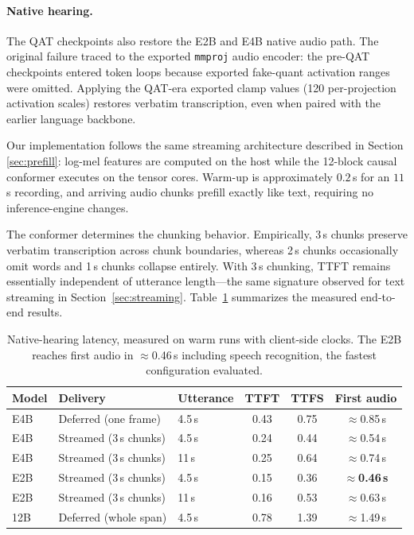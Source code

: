 \documentclass{article}
\begin{document}
\paragraph{Native hearing.}

The QAT checkpoints also restore the E2B and E4B native audio path. The
original failure traced to the exported \texttt{mmproj} audio encoder: the
pre-QAT checkpoints entered token loops because exported fake-quant activation
ranges were omitted. Applying the QAT-era exported clamp values (120
per-projection activation scales) restores verbatim transcription, even when
paired with the earlier language backbone.

Our implementation follows the same streaming architecture described in
Section \ref{sec:prefill}: log-mel features are computed on the host while
the 12-block causal conformer executes on the tensor cores. Warm-up is
approximately $0.2$\,s for an $11$\,s recording, and arriving audio chunks
prefill exactly like text, requiring no inference-engine changes.

The conformer determines the chunking behavior. Empirically, 3\,s chunks
preserve verbatim transcription across chunk boundaries, whereas 2\,s chunks
occasionally omit words and 1\,s chunks collapse entirely. With 3\,s chunking,
TTFT remains essentially independent of utterance length---the same signature
observed for text streaming in Section~\ref{sec:streaming}. Table~\ref{tab:native-hearing}
summarizes the measured end-to-end results.

\begin{table}[H]
\centering
\small
\begin{tabular}{l l l c c c}
\toprule
Model & Delivery & Utterance & TTFT & TTFS & First audio \\
\midrule
E4B & Deferred (one frame) & 4.5\,s & 0.43 & 0.75 & $\approx$0.85\,s \\
E4B & Streamed (3\,s chunks) & 4.5\,s & 0.24 & 0.44 & $\approx$0.54\,s \\
E4B & Streamed (3\,s chunks) & 11\,s & 0.25 & 0.64 & $\approx$0.74\,s \\
E2B & Streamed (3\,s chunks) & 4.5\,s & 0.15 & 0.36 & \textbf{$\approx$0.46\,s} \\
E2B & Streamed (3\,s chunks) & 11\,s & 0.16 & 0.53 & $\approx$0.63\,s \\
12B & Deferred (whole span) & 4.5\,s & 0.78 & 1.39 & $\approx$1.49\,s \\
\bottomrule
\end{tabular}
\caption{Native-hearing latency, measured on warm runs with client-side clocks.
The E2B reaches first audio in $\approx$0.46\,s including speech recognition,
the fastest configuration evaluated.}
\label{tab:native-hearing}
\end{table}
\end{document}
